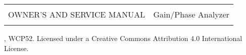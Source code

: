 \begin{titlingpage}
\begin{tabularx}{\textwidth}{Xr}
\hline
\\
{\LARGE OWNER'S AND SERVICE MANUAL} &
Gain/Phase Analyzer \\
\\
\hline
\end{tabularx}
\vfill
\begin{center}
\end{center}
\vfill
\begin{center}
, WCP52. Licensed under a Creative Commons Attribution 4.0 International License.
\end{center}
\end{titlingpage}
